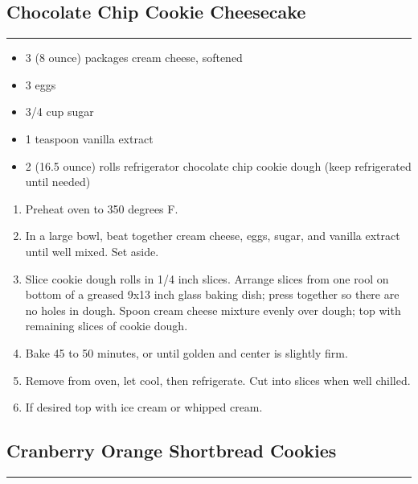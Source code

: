 \documentclass{article}
\begin{document}
\subsection{Chocolate Chip Cookie Cheesecake} 
\noindent\rule[0.5ex]{\linewidth}{1pt}

\begin{framed}
\begin{itemize}
    \item 3 (8 ounce) packages cream cheese, softened
    \item 3 eggs
    \item 3/4 cup sugar
    \item 1 teaspoon vanilla extract
    \item 2 (16.5 ounce) rolls refrigerator chocolate chip cookie dough (keep refrigerated until needed)
\end{itemize}
\end{framed}

\begin{enumerate}
    \item 
        Preheat oven to 350 degrees F.
    \item 
        In a large bowl, beat together cream cheese, eggs, sugar, and vanilla extract until well mixed. Set aside.
    \item 
        Slice cookie dough rolls in 1/4 inch slices. Arrange slices from one rool on bottom of a greased 9x13 inch glass baking dish; press together so there are no holes in dough. Spoon cream cheese mixture evenly over dough; top with remaining slices of cookie dough.
    \item 
        Bake 45 to 50 minutes, or until golden and center is slightly firm.
    \item 
        Remove from oven, let cool, then refrigerate. Cut into slices when well chilled.
    \item 
        If desired top with ice cream or whipped cream.
\end{enumerate}
\newpage

\subsection{Cranberry Orange Shortbread Cookies} 
\noindent\rule[0.5ex]{\linewidth}{1pt}
\end{document}
